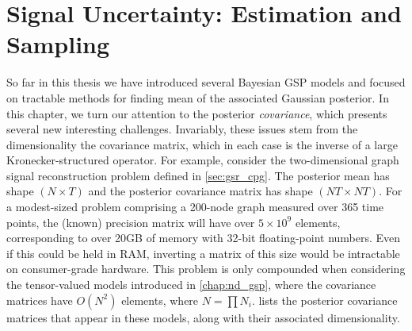 \chapter{Signal Uncertainty: Estimation and Sampling} %

\label{chap:variance} %


So far in this thesis we have introduced several Bayesian GSP models and focused on tractable methods for finding mean of the associated Gaussian posterior. In this chapter, we turn our attention to the posterior \textit{covariance}, which presents several new interesting challenges. Invariably, these issues stem from the dimensionality the covariance matrix, which in each case is the inverse of a large Kronecker-structured operator. For example, consider the two-dimensional graph signal reconstruction problem defined in \cref{sec:gsr_cpg}. The posterior mean has shape $(N \times T)$ and the posterior covariance matrix has shape $(NT \times NT)$. For a modest-sized problem comprising a 200-node graph measured over 365 time points, the (known) precision matrix will have over $5 \times 10^9$ elements, corresponding to over 20GB of memory with 32-bit floating-point numbers. Even if this could be held in RAM, inverting a matrix of this size would be intractable on consumer-grade hardware. This problem is only compounded when considering the tensor-valued models introduced in \cref{chap:nd_gsp}, where the covariance matrices have $O(N^2)$ elements, where $N = \prod N_i$.  lists the posterior covariance matrices that appear in these models, along with their associated dimensionality. 

\setcellgapes{8pt}
\makegapedcells

